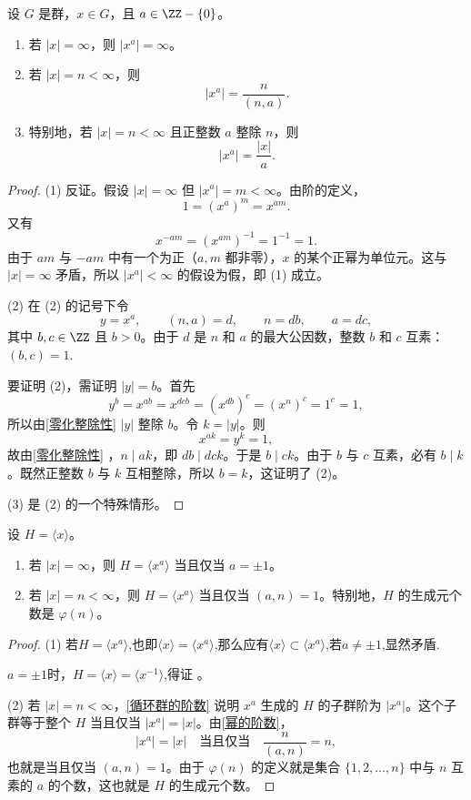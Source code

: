 \begin{proposition}\label{幂的阶数}
	设 $G$ 是群，$x\in G$，且 $a\in\ZZ-\{0\}$。
	\begin{enumerate}[label=(\arabic*)]
		\item 若 $|x|=\infty$，则 $|x^a|=\infty$。
		\item 若 $|x|=n<\infty$，则
		\[
		|x^a|=\frac{n}{(n,a)}.
		\]
		\item 特别地，若 $|x|=n<\infty$ 且正整数 $a$ 整除 $n$，则
		\[
		|x^a|=\frac{|x|}{a}.
		\]
	\end{enumerate}
\end{proposition}
\begin{proof}
	(1) 反证。假设 $|x|=\infty$ 但 $|x^a|=m<\infty$。由阶的定义，
	\[
	1=(x^a)^m=x^{am}.
	\]
	又有
	\[
	x^{-am}=(x^{am})^{-1}=1^{-1}=1.
	\]
	由于 $am$ 与 $-am$ 中有一个为正（$a,m$ 都非零），$x$ 的某个正幂为单位元。这与 $|x|=\infty$ 矛盾，所以 $|x^a|<\infty$ 的假设为假，即 (1) 成立。
	
	(2) 在 (2) 的记号下令
	\[
	y=x^a,
	\qquad (n,a)=d,
	\qquad n=db,
	\qquad a=dc,
	\]
	其中 $b,c\in\ZZ$ 且 $b>0$。由于 $d$ 是 $n$ 和 $a$ 的最大公因数，整数 $b$ 和 $c$ 互素：$(b,c)=1.$

	要证明 (2)，需证明 $|y|=b$。首先
	\[
	y^b=x^{ab}=x^{dcb}=(x^{db})^c=(x^n)^c=1^c=1,
	\]
	所以由\ref{零化整除性}  $|y|$ 整除 $b$。令 $k=|y|$。则
	\[
	x^{ak}=y^k=1,
	\]
	故由\ref{零化整除性} ，$n\mid ak$，即 $db\mid dck$。于是 $b\mid ck$。由于 $b$ 与 $c$ 互素，必有 $b\mid k$。既然正整数 $b$ 与 $k$ 互相整除，所以 $b=k$，这证明了 (2)。
	
	(3) 是 (2) 的一个特殊情形。
\end{proof}

\begin{proposition}
	设 $H=\langle x\rangle$。
	\begin{enumerate}[label=(\arabic*)]
		\item 若 $|x|=\infty$，则 $H=\langle x^a\rangle$ 当且仅当 $a=\pm1$。
		\item 若 $|x|=n<\infty$，则 $H=\langle x^a\rangle$ 当且仅当 $(a,n)=1$。特别地，$H$ 的生成元个数是 $\varphi(n)$。
	\end{enumerate}
\end{proposition}
\begin{proof}
	(1) 若$H=\langle x^a\rangle$,也即$\langle x \rangle =\langle x^a\rangle$,那么应有$ \langle x \rangle \subset \langle x^a\rangle$,若$a\neq \pm1$,显然矛盾. 
	
	$a=\pm1$时，$H = \langle x \rangle = \langle x^{-1} \rangle$,得证 。
	
	
		
	(2) 若 $|x|=n<\infty$，\ref{循环群的阶数} 说明 $x^a$ 生成的 $H$ 的子群阶为 $|x^a|$。这个子群等于整个 $H$ 当且仅当 $|x^a|=|x|$。由\ref{幂的阶数}，
	\[
	|x^a|=|x| \quad\text{当且仅当}\quad \frac{n}{(a,n)}=n,
	\]
	也就是当且仅当 $(a,n)=1$。由于 $\varphi(n)$ 的定义就是集合 $\{1,2,\ldots,n\}$ 中与 $n$ 互素的 $a$ 的个数，这也就是 $H$ 的生成元个数。
\end{proof}


